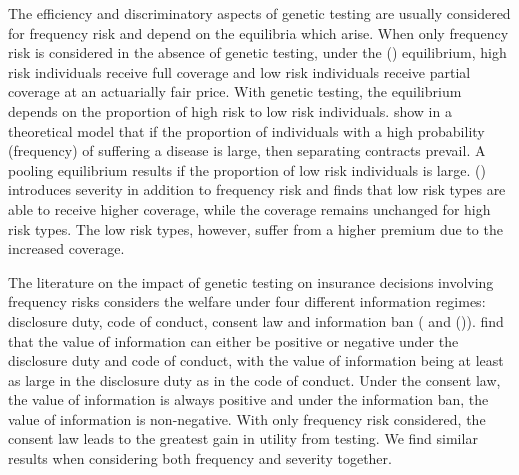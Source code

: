 \documentclass[nonatbib,preprint,12pt]{elsarticle}
\theoremstyle{plain}
\theoremstyle{definition}
\theoremstyle{plain}
\theoremstyle{TheoremNum}
\theoremstyle{CorollaryNum}
\theoremstyle{PropositionNum}
\theoremstyle{TheoremNum}
\begin{document}
The efficiency and discriminatory aspects of genetic testing are usually considered for frequency risk and depend on the equilibria which arise. When only frequency risk is considered in the absence of genetic testing, under the \citeauthor{rothschild1978equilibrium} (\citeyear{rothschild1978equilibrium}) equilibrium, high risk individuals receive full coverage and low risk individuals receive partial coverage at an actuarially fair price. With genetic testing, the equilibrium depends on the proportion of high risk to low risk individuals. \textcite{hoy2003impact} show in a theoretical model that if the proportion of individuals with a high probability (frequency) of suffering a disease is large, then separating contracts prevail. A pooling equilibrium results if the proportion of low risk individuals is large. \citeauthor{doherty1995severity} (\citeyear{doherty1995severity}) introduces severity in addition to frequency risk and finds that low risk types are able to receive higher coverage, while the coverage remains unchanged for high risk types. The low risk types, however, suffer from a higher premium due to the increased coverage. 

The literature on the impact of genetic testing on insurance decisions involving frequency risks considers the welfare under four different information regimes: disclosure duty, code of conduct, consent law and information ban (\textcite{barigozzi2011genetic} and
\citeauthor*{peter2017endogenous} (\citeyear{peter2017endogenous})). \textcite{barigozzi2011genetic} find that the value of information can either be positive or negative under the disclosure duty and code of conduct, with the value of information being at least as large in the disclosure duty as in the code of conduct. Under the consent law, the value of information is always positive and under the information ban, the value of information is non-negative. With only frequency risk considered, the consent law leads to the greatest gain in utility from testing. We find similar results when considering both frequency and severity together. 
\end{document}
